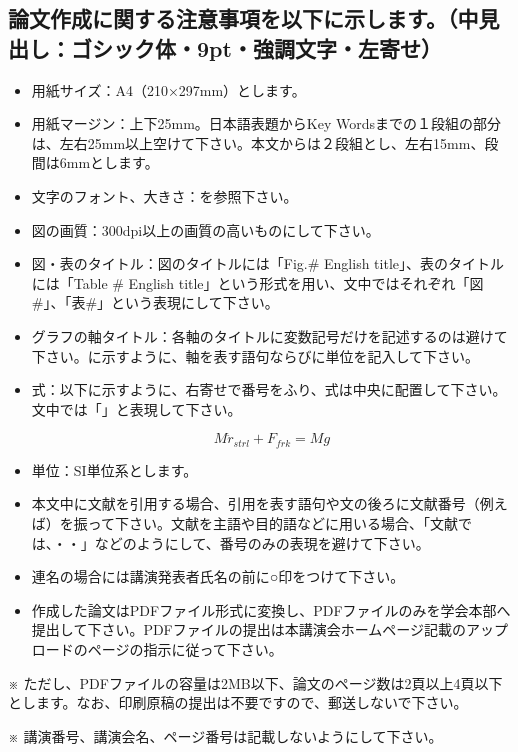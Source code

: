\documentclass{bxjsarticle} %
\begin{document}
\subsection{論文作成に関する注意事項を以下に示します。（中見出し：ゴシック体・9pt・強調文字・左寄せ）}%
\begin{itemize}
	\item 用紙サイズ：A4（210×297mm）とします。
	\item 用紙マージン：上下25mm。日本語表題からKey Wordsまでの１段組の部分は、左右25mm以上空けて下さい。本文からは２段組とし、左右15mm、段間は6mmとします。
	\item 文字のフォント、大きさ：を参照下さい。
	\item 図の画質：300dpi以上の画質の高いものにして下さい。
	\item 図・表のタイトル：図のタイトルには「Fig.\# English title」、表のタイトルには「Table \# English title」という形式を用い、文中ではそれぞれ「図\#」、「表\#」という表現にして下さい。
	\item グラフの軸タイトル：各軸のタイトルに変数記号だけを記述するのは避けて下さい。に示すように、軸を表す語句ならびに単位を記入して下さい。
	\item 式：以下に示すように、右寄せで番号をふり、式は中央に配置して下さい。文中では「」と表現して下さい。

	\begin{equation}
		M\ddot{r}_{strl} + F_{frk} = Mg
		\label{eqn: eq1}
	\end{equation}

	\item 単位：SI単位系とします。
	\item 本文中に文献を引用する場合、引用を表す語句や文の後ろに文献番号（例えば\cite{Shinjuku98}）を振って下さい。文献を主語や目的語などに用いる場合、「文献\cite{Shinjuku98}では、・・」などのようにして、番号のみの表現を避けて下さい。
	\item 連名の場合には講演発表者氏名の前に○印をつけて下さい。
	\item 作成した論文はPDFファイル形式に変換し、PDFファイルのみを学会本部へ提出して下さい。PDFファイルの提出は本講演会ホームページ記載のアップロードのページの指示に従って下さい。
\end{itemize}

※ ただし、PDFファイルの容量は2MB以下、論文のページ数は2頁以上4頁以下とします。なお、印刷原稿の提出は不要ですので、郵送しないで下さい。

※ 講演番号、講演会名、ページ番号は記載しないようにして下さい。
\end{document}
